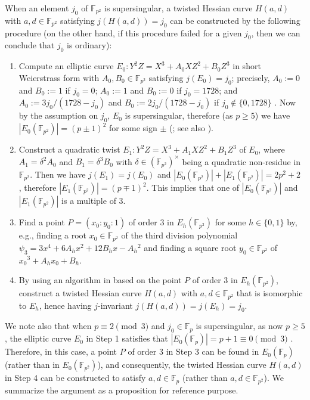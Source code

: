 \documentclass{article}
\theoremstyle{definition}
\newcommand{\FF}{\mathbb{F}}
\begin{document}
When an element $j_0$ of $\FF_{p^2}$ is supersingular, a twisted Hessian curve $H(a,d)$ with $a,d \in \FF_{p^2}$ satisfying $j(H(a,d)) = j_0$ can be constructed by the following procedure (on the other hand, if this procedure failed for a given $j_0$, then we can conclude that $j_0$ is ordinary):
\begin{enumerate}
\item
Compute an elliptic curve $E_0 \colon Y^2 Z = X^3 + A_0 X Z^2 + B_0 Z^3$ in short Weierstrass form with $A_0, B_0 \in \FF_{p^2}$ satisfying $j(E_0) = j_0$; precisely, $A_0 := 0$ and $B_0 := 1$ if $j_0 = 0$; $A_0 := 1$ and $B_0 := 0$ if $j_0 = 1728$; and $A_0 := 3 j_0 / (1728 - j_0)$ and $B_0 := 2 j_0 / (1728 - j_0)$ if $j_0 \not\in \{0,1728\}$ \cite[Section 2.7]{Washington:book}.
Now by the assumption on $j_0$, $E_0$ is supersingular, therefore (as $p \geq 5$) we have $|E_0(\FF_{p^2})| = (p \pm 1)^2$ for some sign $\pm$ (\cite{ruck1987note}; see also \cite[Section 2.3]{DBLP:journals/lmsjcm/Sutherland12a}).
\item
Construct a quadratic twist $E_1 \colon Y^2 Z = X^3 + A_1 X Z^2 + B_1 Z^3$ of $E_0$, where $A_1 = \delta^2 A_0$ and $B_1 = \delta^3 B_0$ with $\delta \in (\FF_{p^2})^{\times}$ being a quadratic non-residue in $\FF_{p^2}$.
Then we have $j(E_1) = j(E_0)$ and $|E_0(\FF_{p^2})| + |E_1(\FF_{p^2})| = 2 p^2 + 2$ \cite[Exercise 4.10]{Washington:book}, therefore $|E_1(\FF_{p^2})| = (p \mp 1)^2$.
This implies that one of $|E_0(\FF_{p^2})|$ and $|E_1(\FF_{p^2})|$ is a multiple of $3$.
\item
Find a point $P = (x_0:y_0:1)$ of order $3$ in $E_h(\FF_{p^2})$ for some $h \in \{0,1\}$ by, e.g., finding a root $x_0 \in \FF_{p^2}$ of the third division polynomial $\psi_3 = 3 x^4 + 6A_h x^2 + 12B_h x - A_h{}^2$ and finding a square root $y_0 \in \FF_{p^2}$ of $x_0{}^3 + A_h x_0 + B_h$.
\item
By using an algorithm in \cite[Theorems 5.2 and 5.3]{LC:BCKL15} based on the point $P$ of order $3$ in $E_h(\FF_{p^2})$, construct a twisted Hessian curve $H(a,d)$ with $a,d \in \FF_{p^2}$ that is isomorphic to $E_h$, hence having $j$-invariant $j(H(a,d)) = j(E_h) = j_0$.
\end{enumerate}
We note also that when $p \equiv 2 \pmod{3}$ and $j_0 \in \FF_p$ is supersingular, as now $p \geq 5$, the elliptic curve $E_0$ in Step 1 satisfies that $|E_0(\FF_p)| = p + 1 \equiv 0 \pmod{3}$ \cite[Exercise V.5.10]{Silverman:AEC}.
Therefore, in this case, a point $P$ of order $3$ in Step 3 can be found in $E_0(\FF_p)$ (rather than in $E_0(\FF_{p^2})$), and consequently, the twisted Hessian curve $H(a,d)$ in Step 4 can be constructed to satisfy $a,d \in \FF_p$ (rather than $a,d \in \FF_{p^2}$).
We summarize the argument as a proposition for reference purpose.
\end{document}
